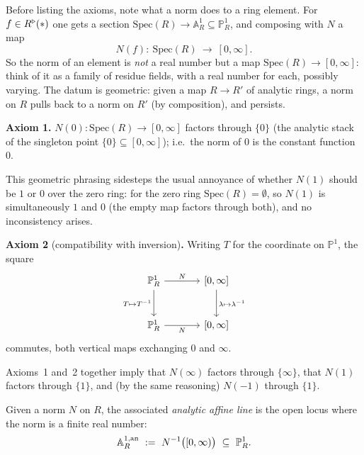 Before listing the axioms, note what a norm does to a ring element. For $f\in
R^{\triangleright}(\ast)$ one gets a section $\mathrm{Spec}(R)\to\mathbb A^1_R\subseteq
\mathbb P^1_R$, and composing with $N$ a map
\begin{equation*}
N(f)\colon\ \mathrm{Spec}(R)\ \longrightarrow\ [0,\infty].
\end{equation*}
So the norm of an element is \emph{not} a real number but a map
$\mathrm{Spec}(R)\to[0,\infty]$: think of it as a family of residue fields, with
a real number for each, possibly varying. The datum is geometric: given a map
$R\to R'$ of analytic rings, a norm on $R$ pulls back to a norm on $R'$ (by
composition), and persists.

\textbf{Axiom 1.} $N(0)\colon\mathrm{Spec}(R)\to[0,\infty]$ factors
through $\{0\}$ (the analytic stack of the singleton point $\{0\}\subseteq
[0,\infty]$); i.e.\ the norm of $0$ is the constant function $0$.

\begin{remark}
\label{rmk:20:zero-ring}
This geometric phrasing sidesteps the usual annoyance of whether $N(1)$ should be
$1$ or $0$ over the zero ring: for the zero ring $\mathrm{Spec}(R)=\emptyset$, so
$N(1)$ is simultaneously $1$ and $0$ (the empty map factors through both), and no
inconsistency arises.
\end{remark}

\textbf{Axiom 2} (compatibility with inversion)\textbf{.} Writing $T$ for the
coordinate on $\mathbb P^1$, the square
\begin{equation*}
\begin{tikzcd}[column sep=large, row sep=large]
\mathbb P^1_R \arrow[r, "N"] \arrow[d, "T\mapsto T^{-1}"'] & {[0,\infty]}
\arrow[d, "\lambda\mapsto\lambda^{-1}"] \\
\mathbb P^1_R \arrow[r, "N"'] & {[0,\infty]}
\end{tikzcd}
\end{equation*}
commutes, both vertical maps exchanging $0$ and $\infty$.

Axioms~1 and~2 together imply that $N(\infty)$ factors through $\{\infty\}$, that
$N(1)$ factors through $\{1\}$, and (by the same reasoning) $N(-1)$ through
$\{1\}$.

\begin{definition}
\label{def:20:analytic-affine-line}
Given a norm $N$ on $R$, the associated \emph{analytic affine line} is the open
locus where the norm is a finite real number:
\begin{equation*}
\Aan_R\ :=\ N^{-1}\bigl([0,\infty)\bigr)\ \subseteq\ \mathbb P^1_R .
\end{equation*}
\end{definition}

